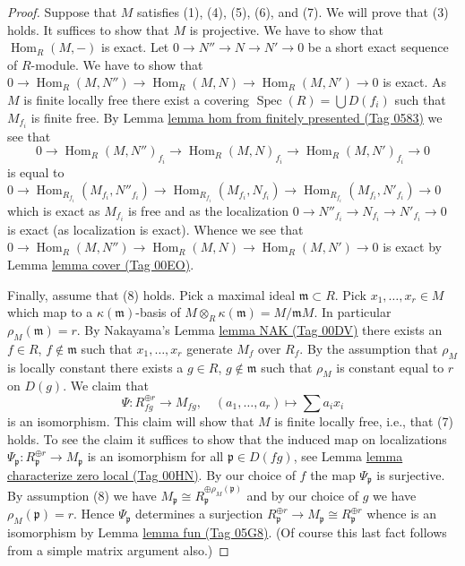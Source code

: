 \documentclass{amsart}
\theoremstyle{plain}
\theoremstyle{definition}
\theoremstyle{remark}
\numberwithin{equation}{subsection}
\def\Spec{\mathop{\mathrm{Spec}}}
\def\Hom{\mathop{\mathrm{Hom}}\nolimits}
\begin{document}
\begin{proof}
\medskip\noindent
Suppose that $M$ satisfies (1), (4), (5), (6), and (7).
We will prove that (3) holds. It suffices
to show that $M$ is projective. We have to show that $\Hom_R(M, -)$
is exact. Let $0 \to N'' \to N \to N'\to 0$ be a short exact sequence of
$R$-module. We have to show that
$0 \to \Hom_R(M, N'') \to \Hom_R(M, N) \to
\Hom_R(M, N') \to 0$ is exact.
As $M$ is finite locally free there exist a covering
$\Spec(R) = \bigcup D(f_i)$ such that $M_{f_i}$ is finite free.
By
Lemma \href{https://stacks.math.columbia.edu/tag/0583}{lemma hom from finitely presented (Tag 0583)}
we see that
$$
0 \to \Hom_R(M, N'')_{f_i} \to \Hom_R(M, N)_{f_i} \to
\Hom_R(M, N')_{f_i} \to 0
$$
is equal to
$0 \to \Hom_{R_{f_i}}(M_{f_i}, N''_{f_i}) \to
\Hom_{R_{f_i}}(M_{f_i}, N_{f_i}) \to
\Hom_{R_{f_i}}(M_{f_i}, N'_{f_i}) \to 0$
which is exact as $M_{f_i}$ is free and as the localization
$0 \to N''_{f_i} \to N_{f_i} \to N'_{f_i} \to 0$
is exact (as localization is exact). Whence we see that
$0 \to \Hom_R(M, N'') \to \Hom_R(M, N) \to
\Hom_R(M, N') \to 0$ is exact by
Lemma \href{https://stacks.math.columbia.edu/tag/00EO}{lemma cover (Tag 00EO)}.

\medskip\noindent
Finally, assume that (8) holds. Pick a maximal ideal $\mathfrak m \subset R$.
Pick $x_1, \ldots, x_r \in M$ which map to a $\kappa(\mathfrak m)$-basis of
$M \otimes_R \kappa(\mathfrak m) = M/\mathfrak mM$. In particular
$\rho_M(\mathfrak m) = r$. By
Nakayama's Lemma \href{https://stacks.math.columbia.edu/tag/00DV}{lemma NAK (Tag 00DV)}
there exists an $f \in R$, $f \not \in \mathfrak m$ such that
$x_1, \ldots, x_r$ generate $M_f$ over $R_f$. By the assumption that
$\rho_M$ is locally constant there exists a $g \in R$, $g \not \in \mathfrak m$
such that $\rho_M$ is constant equal to $r$ on $D(g)$. We claim that
$$
\Psi : R_{fg}^{\oplus r} \longrightarrow M_{fg}, \quad
(a_1, \ldots, a_r) \longmapsto \sum a_i x_i
$$
is an isomorphism. This claim will show that $M$ is finite locally
free, i.e., that (7) holds. To see the claim
it suffices to show that the induced map on localizations
$\Psi_{\mathfrak p} : R_{\mathfrak p}^{\oplus r} \to M_{\mathfrak p}$
is an isomorphism for all $\mathfrak p \in D(fg)$, see
Lemma \href{https://stacks.math.columbia.edu/tag/00HN}{lemma characterize zero local (Tag 00HN)}.
By our choice of $f$ the map $\Psi_{\mathfrak p}$
is surjective. By assumption (8) we have
$M_{\mathfrak p} \cong R_{\mathfrak p}^{\oplus \rho_M(\mathfrak p)}$
and by our choice of $g$ we have $\rho_M(\mathfrak p) = r$.
Hence $\Psi_{\mathfrak p}$ determines a surjection
$R_{\mathfrak p}^{\oplus r} \to
M_{\mathfrak p} \cong R_{\mathfrak p}^{\oplus r}$
whence is an isomorphism by
Lemma \href{https://stacks.math.columbia.edu/tag/05G8}{lemma fun (Tag 05G8)}.
(Of course this last fact follows from a simple matrix argument also.)
\end{proof}
\end{document}
